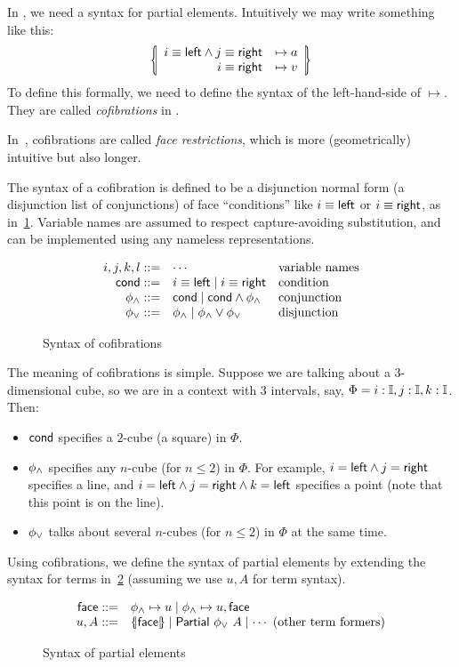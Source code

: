 In \CTT, we need a syntax for partial elements.
Intuitively we may write something like this:
\[\LRbbar{\begin{array}{rc}
  i\equiv\lcon \land j\equiv\rcon&\mapsto a\\
  i\equiv\rcon &\mapsto v
\end{array}}\]
To define this formally, we need to define the syntax of the left-hand-side of $\mapsto$.
They are called \textit{cofibrations} in \CTT.
\begin{terminology}
In~\cite{CCHM}, cofibrations are called \textit{face restrictions},
which is more (geometrically) intuitive but also longer.
\end{terminology}
The syntax of a cofibration is defined to be a disjunction normal form
(a disjunction list of conjunctions) of
face ``conditions'' like $i\equiv\textsf{left}$ or $i\equiv\textsf{right}$, as in~\cref{fig:cofib}.
Variable names are assumed to respect capture-avoiding substitution,
and can be implemented using any nameless representations.
\begin{figure}[h!]
\[\begin{array}{rll}
  i,j,k,l ::= & \cdots & \text{variable names} \\
  \textsf{cond} ::= & i\equiv\textsf{left} \mid i\equiv\textsf{right} & \text{condition} \\
  \phi_\land ::= & \textsf{cond} \mid \textsf{cond} \land \phi_\land & \text{conjunction} \\
  \phi_\lor ::= & \phi_\land \mid \phi_\land \lor \phi_\lor & \text{disjunction}
\end{array}\]
\caption{Syntax of cofibrations}
\label{fig:cofib}
\end{figure}

The meaning of cofibrations is simple. Suppose we are talking about a $3$-dimensional cube,
so we are in a context with $3$ intervals, say, $\Phi=i:\mathbb{I},j:\mathbb{I},k:\mathbb{I}$.
Then:
\begin{itemize}
\item $\textsf{cond}$ specifies a $2$-cube (a square) in $\Phi$.
\item $\phi_\land$ specifies any $n$-cube (for $n\leq 2$) in $\Phi$. For example, $i=\textsf{left}\land j=\textsf{right}$ specifies a line,
and $i=\textsf{left}\land j=\textsf{right}\land k=\textsf{left}$ specifies a point (note that this point is on the line).
\item $\phi_\lor$ talks about several $n$-cubes (for $n\leq 2$) in $\Phi$ at the same time.
\end{itemize}
Using cofibrations, we define the syntax of partial elements
by extending the syntax for terms in~\cref{fig:partial}
(assuming we use $u,A$ for term syntax).
\begin{figure}[h!]
\[\begin{array}{rl}
	\textsf{face}::=&\phi_\land\mapsto u \mid \phi_\land\mapsto u,\textsf{face}\\
	u,A::=&{\{\kern-0.5ex|}{\textsf{face}}{|\kern-0.5ex\}} \mid \textsf{Partial}~{\phi_\lor}~{A} \mid \cdots~\text{(other term formers)}
\end{array}\]
\caption{Syntax of partial elements}
\label{fig:partial}
\end{figure}

